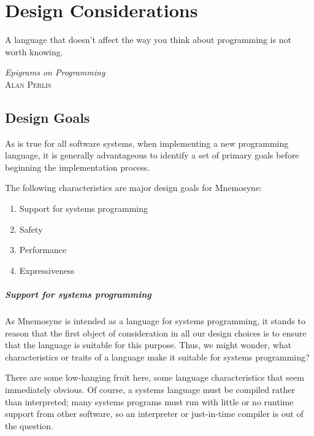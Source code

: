 %
%
%
\chapter{Design Considerations} \label{ch:design}

\epigraph{ A language that doesn't affect the way you think about programming
           is not worth knowing. }%
         { \textit{Epigrams on Programming}~\cite{Perlis:1982:SFE:947955.1083808} \\
          \textsc{Alan Perlis}}


\section{Design Goals} \label{sec:goals}

As is true for all software systems, when implementing a new programming language, it is generally advantageous to identify a set of primary goals before beginning the implementation process.

The following characteristics are major design goals for Mnemosyne:
\begin{enumerate}
    \item Support for systems programming
    \item Safety
    \item Performance
    \item Expressiveness
\end{enumerate}

\paragraph{Support for systems programming}

As Mnemosyne is intended as a language for systems programming, it stands to reason that the first object of consideration in all our design choices is to ensure that the language is suitable for this purpose. Thus, we might wonder, what characteristics or traits of a language make it suitable for systems programming?

There are some low-hanging fruit here, some language characteristics that seem immediately obvious. Of course, a systems language must be compiled rather than interpreted; many systems programs must run with little or no runtime support from other software, so an interpreter or just-in-time compiler is out of the question.

